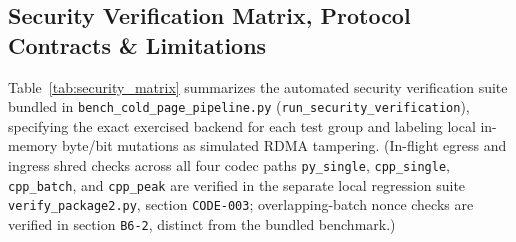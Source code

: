 \documentclass[10pt,twocolumn]{article}
\begin{document}
\begin{table}[htbp]
\centering
\caption{Analytical Serial-Egress 4,096-Token Prefix Transfer Model across 64 Layers ($11.2\text{ GB/s}$ SI Goodput), Separating Measured M3 Max CPU Compute from Projected GPU SRAM ($950\text{ GB/s}$).}
\label{tab:rdma_transfer}
\end{table}

\subsection{Security Verification Matrix, Protocol Contracts \& Limitations}
Table~\ref{tab:security_matrix} summarizes the automated security verification suite bundled in \texttt{bench\_cold\_page\_pipeline.py} (\texttt{run\_security\_verification}), specifying the exact exercised backend for each test group and labeling local in-memory byte/bit mutations as simulated RDMA tampering. (In-flight egress and ingress shred checks across all four codec paths \texttt{py\_single}, \texttt{cpp\_single}, \texttt{cpp\_batch}, and \texttt{cpp\_peak} are verified in the separate local regression suite \texttt{verify\_package2.py}, section \texttt{CODE-003}; overlapping-batch nonce checks are verified in section \texttt{B6-2}, distinct from the bundled benchmark.)
\end{document}
